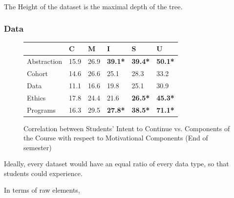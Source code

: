 \documentclass{sig-alternate}
\begin{document}
The Height of the dataset is the maximal depth of the tree.

\subsubsection{Data}

\begin{figure}[hb!]
\centering
\begin{tabular}{l|lllll}
            & C & M & I & S & U  \\\hline
Abstraction & 15.9 & 26.9      & \textbf{39.1*}  & \textbf{39.4*}    & \textbf{50.1*} \\
Cohort      & 14.6 & 26.6      & 25.1   & 28.3      & 33.2  \\
Data        & 11.1 & 16.6       & 19.8    & 25.1     & 30.9  \\
Ethics      & 17.8 & 24.4      & 21.6   & \textbf{26.5*}    & \textbf{45.3*}  \\
Programs    & 16.3 & 29.5      & \textbf{27.8*}  & \textbf{38.5*}    & \textbf{71.1*}
\end{tabular}
\caption{Correlation between Students' Intent to Continue vs. Components of the Course with respect to Motivational Components (End of semester)}
\label{tbl-continue}
\end{figure}


Ideally, every dataset would have an equal ratio of every data type, so that students could experience.

In terms of raw elements, 
\end{document}
